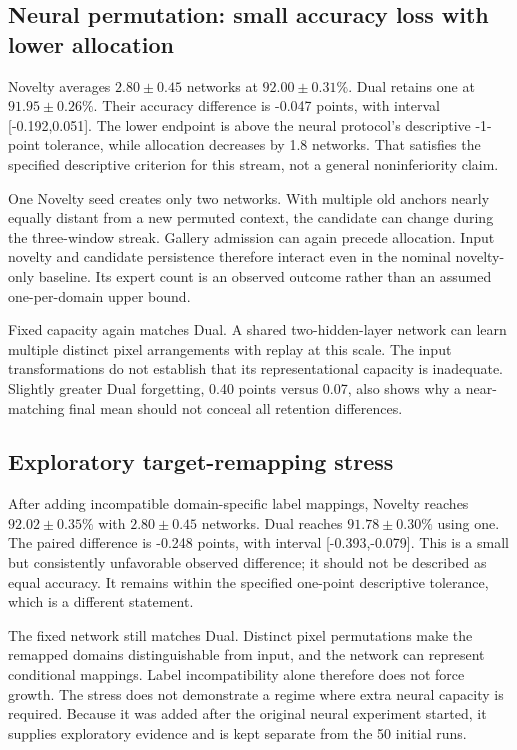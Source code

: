 \subsection{Neural permutation: small accuracy loss with lower allocation}
Novelty averages \(2.80\pm0.45\) networks at \(92.00\pm0.31\%\). Dual retains one at \(91.95\pm0.26\%\). Their accuracy difference is -0.047 points, with interval [-0.192,0.051]. The lower endpoint is above the neural protocol's descriptive -1-point tolerance, while allocation decreases by 1.8 networks. That satisfies the specified descriptive criterion for this stream, not a general noninferiority claim.

One Novelty seed creates only two networks. With multiple old anchors nearly equally distant from a new permuted context, the candidate can change during the three-window streak. Gallery admission can again precede allocation. Input novelty and candidate persistence therefore interact even in the nominal novelty-only baseline. Its expert count is an observed outcome rather than an assumed one-per-domain upper bound.

Fixed capacity again matches Dual. A shared two-hidden-layer network can learn multiple distinct pixel arrangements with replay at this scale. The input transformations do not establish that its representational capacity is inadequate. Slightly greater Dual forgetting, 0.40 points versus 0.07, also shows why a near-matching final mean should not conceal all retention differences.

\subsection{Exploratory target-remapping stress}
After adding incompatible domain-specific label mappings, Novelty reaches \(92.02\pm0.35\%\) with \(2.80\pm0.45\) networks. Dual reaches \(91.78\pm0.30\%\) using one. The paired difference is -0.248 points, with interval [-0.393,-0.079]. This is a small but consistently unfavorable observed difference; it should not be described as equal accuracy. It remains within the specified one-point descriptive tolerance, which is a different statement.

The fixed network still matches Dual. Distinct pixel permutations make the remapped domains distinguishable from input, and the network can represent conditional mappings. Label incompatibility alone therefore does not force growth. The stress does not demonstrate a regime where extra neural capacity is required. Because it was added after the original neural experiment started, it supplies exploratory evidence and is kept separate from the 50 initial runs.

